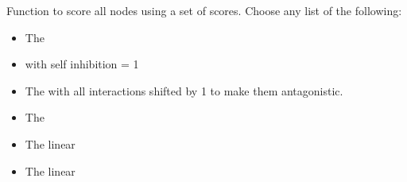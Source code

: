 \documentclass[letterpaper,10pt,english]{sphinxmanual}
\begin{document}
\begin{fulllineitems}
\begin{fulllineitems}
\label{\detokenize{friendlynets:friendlyNet.friendlyNet.score_all_nodes}}
\pysigstartsignatures
{}
\pysigstopsignatures
\sphinxAtStartPar
Function to score all nodes using a set of scores. Choose any list of the following:
\begin{itemize}
\item {} 
\sphinxAtStartPar
{} The {\hyperref[\detokenize{friendlynets:friendlyNet.friendlyNet.lotka_volterra_system}]{}}

\item {} 
\sphinxAtStartPar
{} {\hyperref[\detokenize{friendlynets:friendlyNet.friendlyNet.lotka_volterra_system}]{}} with self inhibition = 1

\item {} 
\sphinxAtStartPar
{} The {\hyperref[\detokenize{friendlynets:friendlyNet.friendlyNet.lotka_volterra_system}]{}} with all interactions shifted by \sphinxhyphen{}1 to make them antagonistic.

\item {} 
\sphinxAtStartPar
{} The {\hyperref[\detokenize{friendlynets:friendlyNet.friendlyNet.replicator_system}]{}}

\item {} 
\sphinxAtStartPar
{} The linear {\hyperref[\detokenize{friendlynets:friendlyNet.friendlyNet.node_balanced_score}]{}}

\item {} 
\sphinxAtStartPar
{} The linear {\hyperref[\detokenize{friendlynets:friendlyNet.friendlyNet.stochastic_score}]{}}

\end{itemize}


\end{fulllineitems}
\end{fulllineitems}
\end{document}
